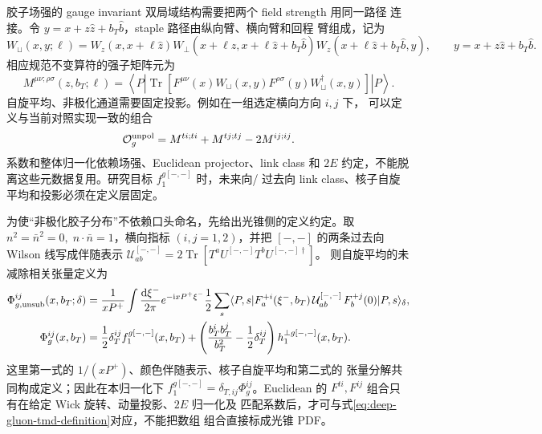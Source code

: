 \documentclass[UTF8,11pt,oneside]{ctexbook}
\newcommand{\dd}{\mathrm{d}}
\begin{document}
胶子场强的 gauge invariant 双局域结构需要把两个 field strength 用同一路径
连接。令 \(y=x+z\hat z+b_T\hat b\)，staple 路径由纵向臂、横向臂和回程
臂组成，记为
\begin{equation}
 W_\sqcup(x,y;\ell)=W_z(x,x+\ell\hat z)
 W_\perp(x+\ell\hat z,x+\ell\hat z+b_T\hat b)
 W_z(x+\ell\hat z+b_T\hat b,y),
 \qquad y=x+z\hat z+b_T\hat b .
 \label{eq:deep-staple-geometry}
\end{equation}
相应规范不变算符的强子矩阵元为
\begin{equation}
 M^{\mu\nu;\rho\sigma}(z,b_T;\ell)
 =\left\langle P\left|
 \operatorname{Tr}\left[F^{\mu\nu}(x)W_\sqcup(x,y)
 F^{\rho\sigma}(y)W_\sqcup^\dagger(x,y)\right]
 \right|P\right\rangle .
 \label{eq:deep-gluon-bilocal}
\end{equation}
自旋平均、非极化通道需要固定投影。例如在一组选定横向方向 \(i,j\) 下，
可以定义与当前对照实现一致的组合
\begin{equation}
 \mathcal O_g^{\rm unpol}
 =M^{ti;ti}+M^{tj;tj}-2M^{ij;ij}.
 \label{eq:deep-gluon-unpolarized-projector}
\end{equation}
系数和整体归一化依赖场强、Euclidean projector、link class 和 \(2E\)
约定，不能脱离这些元数据复用。研究目标 \(f_1^{g[-,-]}\) 时，未来向/
过去向 link class、核子自旋平均和投影必须在定义层固定。

为使“非极化胶子分布”不依赖口头命名，先给出光锥侧的定义约定。取
\(n^2=\bar n^2=0,\;n\cdot\bar n=1\)，横向指标 \((i,j=1,2)\)，并把
\([-,-]\) 的两条过去向 Wilson 线写成伴随表示
\(\mathcal U_{ab}^{[-,-]}=2\operatorname{Tr}[T^aU^{[-,-]}T^bU^{[-,-]\dagger}]\)。
则自旋平均的未减除相关张量定义为
\begin{align}
 \Phi_{g,\rm unsub}^{ij}(x,b_T;\delta)
 &=\frac{1}{xP^+}\int\frac{\dd\xi^-}{2\pi}
 e^{-\mathrm{i}xP^+\xi^-}\frac12\sum_s
 \langle P,s|F_a^{+i}(\xi^-,b_T)\,
 \mathcal U_{ab}^{[-,-]}\,F_b^{+j}(0)|P,s\rangle_\delta,\\
 \Phi_g^{ij}(x,b_T)&=\frac12\delta_T^{ij}f_1^{g[-,-]}(x,b_T)+
 \left(\frac{b_T^ib_T^j}{b_T^2}-\frac12\delta_T^{ij}\right)
 h_1^{\perp g[-,-]}(x,b_T).
 \label{eq:deep-gluon-tmd-definition}
\end{align}
这里第一式的 \(1/(xP^+)\)、颜色伴随表示、核子自旋平均和第二式的
张量分解共同构成定义；因此在本归一化下
\(f_1^{g[-,-]}=\delta_{T,ij}\Phi_g^{ij}\)。Euclidean 的
\(F^{ti},F^{ij}\) 组合只有在给定 Wick 旋转、动量投影、\(2E\) 归一化及
匹配系数后，才可与式\eqref{eq:deep-gluon-tmd-definition}对应，不能把数组
组合直接标成光锥 PDF。
\end{document}
